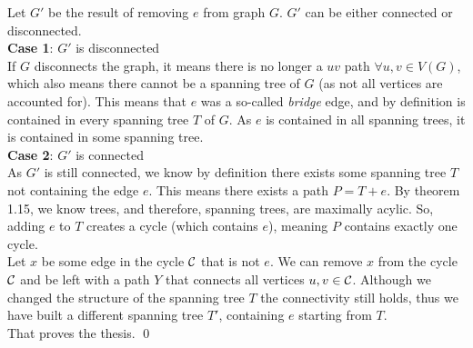 Let $G'$ be the result of removing $e$ from graph $G$. $G'$ can be either connected or disconnected. \\
\linebreak 
\textbf{Case 1}: $G'$ is disconnected \\
If $G$ disconnects the graph, it means there is no longer a $uv$ path $\forall u,v \in V(G)$, which also means there cannot be a spanning tree of $G$ (as not all vertices are accounted for). This means that $e$ was a so-called \textit{bridge} edge, and by definition is contained in every spanning tree $T$ of $G$. As $e$ is contained in all spanning trees, it is contained in some spanning tree. \\
\linebreak 
\textbf{Case 2}: $G'$ is connected \\
As $G'$ is still connected, we know by definition there exists some spanning tree $T$ not containing the edge $e$. This means there exists a path $P = T + e$. By theorem 1.15, we know trees, and therefore, spanning trees, are maximally acylic. So, adding $e$ to $T$ creates a cycle (which contains $e$), meaning $P$ contains exactly one cycle. \\
\linebreak 
Let $x$ be some edge in the cycle $\mathcal{C}$ that is not $e$. We can remove $x$ from the cycle $\mathcal{C}$ and be left with a path $Y$ that connects all vertices $u, v \in \mathcal{C}$. Although we changed the structure of the spanning tree $T$ the connectivity still holds, thus we have built a different spanning tree $T'$, containing $e$ starting from $T$. \\
\linebreak
That proves the thesis. \qed

